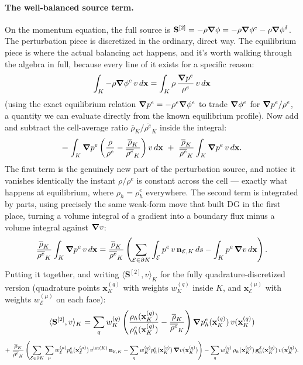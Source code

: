 \paragraph{The well-balanced source term.} On the momentum equation, the full source is $\mathbf{S}^{[2]} = -\rho\grad\phi = -\rho\grad\phi^e - \rho\grad\phi^\delta$. The perturbation piece is discretized in the ordinary, direct way. The equilibrium piece is where the actual balancing act happens, and it's worth walking through the algebra in full, because every line of it exists for a specific reason:
\[
	\int_K -\rho\grad\phi^e\, v\, d\mathbf{x}
	= \int_K \rho\,\frac{\grad p^e}{\rho^e}\, v\, d\mathbf{x}
\]
(using the exact equilibrium relation $\grad p^e = -\rho^e\grad\phi^e$ to trade $\grad\phi^e$ for $\grad p^e/\rho^e$, a quantity we can evaluate directly from the known equilibrium profile). Now add and subtract the cell-average ratio $\overline{\rho}_K/\overline{\rho^e}_K$ inside the integral:
\[
	= \int_K \grad p^e\left(\frac{\rho}{\rho^e} - \frac{\overline{\rho}_K}{\overline{\rho^e}_K}\right) v\, d\mathbf{x} \ +\ \frac{\overline{\rho}_K}{\overline{\rho^e}_K}\int_K \grad p^e\, v\, d\mathbf{x}.
\]
The first term is the genuinely new part of the perturbation source, and notice it vanishes identically the instant $\rho/\rho^e$ is constant across the cell — exactly what happens at equilibrium, where $\rho_h = \rho_h^e$ everywhere. The second term is integrated by parts, using precisely the same weak-form move that built DG in the first place, turning a volume integral of a gradient into a boundary flux minus a volume integral against $\grad v$:
\[
	\frac{\overline{\rho}_K}{\overline{\rho^e}_K}\int_K \grad p^e\, v\, d\mathbf{x} = \frac{\overline{\rho}_K}{\overline{\rho^e}_K}\left(\sum_{\mathcal{E}\in\partial K}\int_{\mathcal{E}} p^e\, v\, \mathbf{n}_{\mathcal{E},K}\, ds - \int_K p^e\, \grad v\, d\mathbf{x}\right).
\]
Putting it together, and writing $\langle \mathbf{S}^{[2]},v\rangle_K$ for the fully quadrature-discretized version (quadrature points $\mathbf{x}_K^{(q)}$ with weights $w_K^{(q)}$ inside $K$, and $\mathbf{x}_\mathcal{E}^{(\mu)}$ with weights $w_\mathcal{E}^{(\mu)}$ on each face):
\[
	\langle\mathbf{S}^{[2]},v\rangle_K =
	\sum_{q} w_K^{(q)}\left(\frac{\rho_h(\mathbf{x}_K^{(q)})}{\rho_h^e(\mathbf{x}_K^{(q)})} - \frac{\overline{\rho}_K}{\overline{\rho^e}_K}\right)\grad p_h^e(\mathbf{x}_K^{(q)})\, v(\mathbf{x}_K^{(q)})
\]
\[
	+\ \frac{\overline{\rho}_K}{\overline{\rho^e}_K}\left(\sum_{\mathcal{E}\in\partial K}\sum_{\mu} w_\mathcal{E}^{(\mu)} p_h^e(\mathbf{x}_\mathcal{E}^{(\mu)})\, v^{\mathrm{int}(K)}\, \mathbf{n}_{\mathcal{E},K} - \sum_{q} w_K^{(q)} p_h^e(\mathbf{x}_K^{(q)})\, \grad v(\mathbf{x}_K^{(q)})\right)
	-\sum_{q} w_K^{(q)}\, \rho_h(\mathbf{x}_K^{(q)})\, \mathbf{g}_h^\delta(\mathbf{x}_K^{(q)})\, v(\mathbf{x}_K^{(q)}).
\]

